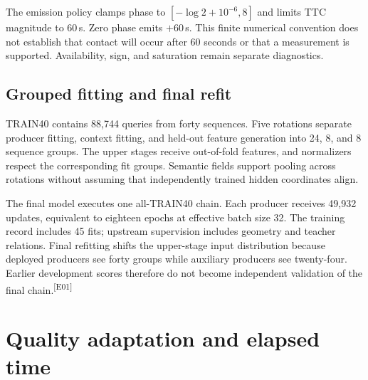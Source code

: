 \documentclass[twocolumn,letterpaper]{article}
\newcommand{\evid}[1]{\textsuperscript{\textsf{[#1]}}}
\begin{document}
The emission policy clamps phase to $[-\log2+10^{-6},8]$ and limits TTC magnitude to 60\,s. Zero phase emits $+60$\,s. This finite numerical convention does not establish that contact will occur after 60 seconds or that a measurement is supported. Availability, sign, and saturation remain separate diagnostics.

\subsection{Grouped fitting and final refit}
TRAIN40 contains 88,744 queries from forty sequences. Five rotations separate producer fitting, context fitting, and held-out feature generation into 24, 8, and 8 sequence groups. The upper stages receive out-of-fold features, and normalizers respect the corresponding fit groups. Semantic fields support pooling across rotations without assuming that independently trained hidden coordinates align.

The final model executes one all-TRAIN40 chain. Each producer receives 49,932 updates, equivalent to eighteen epochs at effective batch size 32. The training record includes 45 fits; upstream supervision includes geometry and teacher relations. Final refitting shifts the upper-stage input distribution because deployed producers see forty groups while auxiliary producers see twenty-four. Earlier development scores therefore do not become independent validation of the final chain.\evid{E01}

\section{Quality adaptation and elapsed time}
\label{sec:adapt}
\end{document}
